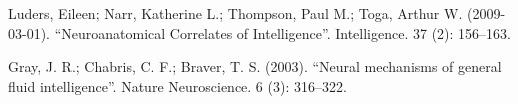 \documentclass[conference]{IEEEtran}
\begin{document}
\begin{thebibliography}{00}
 Luders, Eileen; Narr, Katherine L.; Thompson, Paul M.; Toga, Arthur W. (2009-03-01). ``Neuroanatomical Correlates of Intelligence''. Intelligence. 37 (2): 156–163.

 Gray, J. R.; Chabris, C. F.; Braver, T. S. (2003). ``Neural mechanisms of general fluid intelligence''. Nature Neuroscience. 6 (3): 316–322.




\end{thebibliography}
\vspace{12pt}
\end{document}
